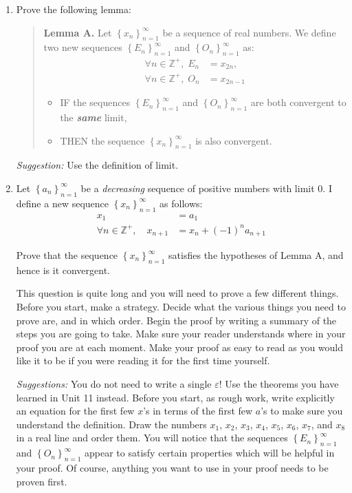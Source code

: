 \documentclass[12pt]{exam}
\newcommand {\DS} [1] {${\displaystyle #1}$}
\newcommand{\vv}{\vspace{.1cm}}
\newcommand{\Z}{\mathbb{Z}}
\newcommand{\e}{\varepsilon}
\begin{document}
\begin{enumerate}

\item Prove the following lemma:
	\begin{quotation} \noindent
	{\bf Lemma A.}
		 Let \DS{\left\{x_n\right\}_{n=1}^{\infty}} be a sequence of real numbers.  We define two new sequences \DS{\left\{E_n\right\}_{n=1}^{\infty}} and \DS{\left\{O_n\right\}_{n=1}^{\infty}} as:
			$$
			\begin{aligned}
				\forall n \in \Z^+, \; E_n&=x_{2n}, \\
				\forall n \in \Z^+, \; O_n&=x_{2n-1} 
			\end{aligned}
			$$
		\begin{itemize}
			\item IF the sequences \DS{\left\{E_n\right\}_{n=1}^{\infty}} and \DS{\left\{O_n\right\}_{n=1}^{\infty}} are both convergent to the {\bf \emph{same}} limit,
			\item THEN the sequence \DS{\left\{x_n\right\}_{n=1}^{\infty}} is also convergent.
		\end{itemize}
	\end{quotation}
	\emph{Suggestion:} Use the definition of limit.

\vv

\item Let \DS{\left\{a_n\right\}_{n=1}^{\infty}} be a \emph{decreasing} sequence of positive numbers with limit $0$.  I define a new sequence \DS{\left\{x_n\right\}_{n=1}^{\infty}} as follows:
	$$
	\begin{aligned}
		x_1 &= a_1 \\
		\forall n \in \Z^+, \quad x_{n+1} &= x_n + (-1)^n a_{n+1}
	\end{aligned}
	$$
	
	 Prove that the sequence \DS{\left\{x_n\right\}_{n=1}^{\infty}} satisfies the hypotheses of Lemma A, and hence is it convergent.

	This question is quite long and you will need to prove a few different things.  Before you start, make a strategy.  Decide what the various things you need to prove are, and in which order.  Begin the proof by writing a summary of the steps you are going to take.  Make sure your reader understands where in your proof you are at each moment.  Make your proof as easy to read as you would like it to be if you were reading it for the first time yourself.
		 
	 \emph{Suggestions:}  You do not need to write a single $\e$!  Use the theorems you have learned in Unit 11 instead.
	 Before you start, as rough work, write explicitly an equation for the first few $x$'s in terms of the first few $a$'s to make sure you understand the definition.  Draw the numbers $x_1$, $x_2$, $x_3$, $x_4$, $x_5$, $x_6$, $x_7$, and $x_8$ in a real line and order them.   You will notice that the sequences \DS{\left\{E_n\right\}_{n=1}^{\infty}}  and \DS{\left\{O_n\right\}_{n=1}^{\infty}} appear to satisfy certain properties which will be helpful in your proof.  Of course, anything you want to use in your proof needs to be proven first.
	

\end{enumerate}
\end{document}
